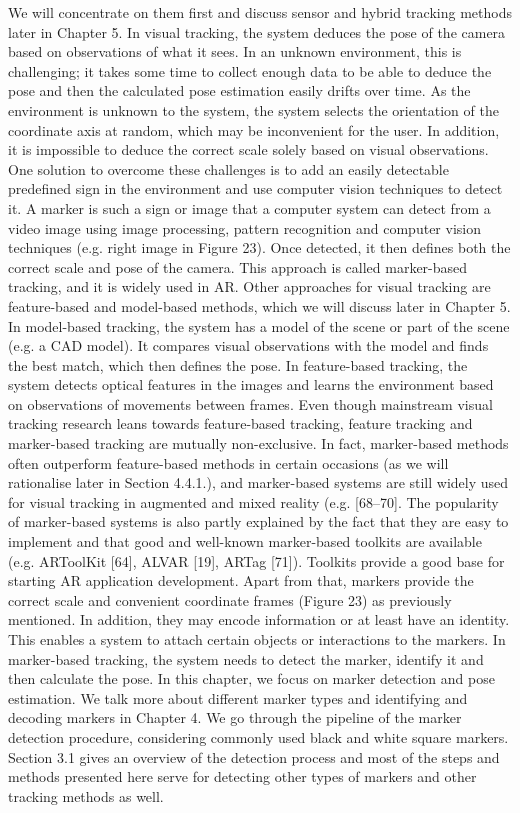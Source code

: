 We will concentrate on them first and discuss sensor and hybrid tracking methods later in Chapter 5. In visual tracking, the system deduces the pose of the camera based on observations of what it sees. In an unknown environment, this is challenging; it takes some time to collect enough data to be able to deduce the pose and then the calculated pose estimation easily drifts over time. As the environment is unknown to the system, the system selects the orientation of the coordinate axis at random, which may be inconvenient for the user. In addition, it is impossible to deduce the correct scale solely based on visual observations. One solution to overcome these challenges is to add an easily detectable predefined sign in the environment and use computer vision techniques to detect it. A marker is such a sign or image that a computer system can detect from a video image using image processing, pattern recognition and computer vision techniques (e.g. right image in Figure 23). Once detected, it then defines both the correct scale and pose of the camera. This approach is called marker-based tracking, and it is widely used in AR. Other approaches for visual tracking are feature-based and model-based methods, which we will discuss later in Chapter 5. In model-based tracking, the system has a model of the scene or part of the scene (e.g. a CAD model). It compares visual observations with the model and finds the best match, which then defines the pose. In feature-based tracking, the system detects optical features in the images and learns the environment based on observations of movements between frames. Even though mainstream visual tracking research leans towards feature-based tracking, feature tracking and marker-based tracking are mutually non-exclusive. In fact, marker-based methods often outperform feature-based methods in certain occasions (as we will rationalise later in Section 4.4.1.), and marker-based systems are still widely used for visual tracking in augmented and mixed reality (e.g. [68–70]. The popularity of marker-based systems is also partly explained by the fact that they are easy to implement and that good and well-known marker-based toolkits are available (e.g. ARToolKit [64], ALVAR [19], ARTag [71]). Toolkits provide a good base for starting AR application development. Apart from that, markers provide the correct scale and convenient coordinate frames (Figure 23) as previously mentioned. In addition, they may encode information or at least have an identity. This enables a system to attach certain objects or interactions to the markers. In marker-based tracking, the system needs to detect the marker, identify it and then calculate the pose. In this chapter, we focus on marker detection and pose estimation. We talk more about different marker types and identifying and decoding markers in Chapter 4. We go through the pipeline of the marker detection procedure, considering commonly used black and white square markers. Section 3.1 gives an overview of the detection process and most of the steps and methods presented here serve for detecting other types of markers and other tracking methods as well.

